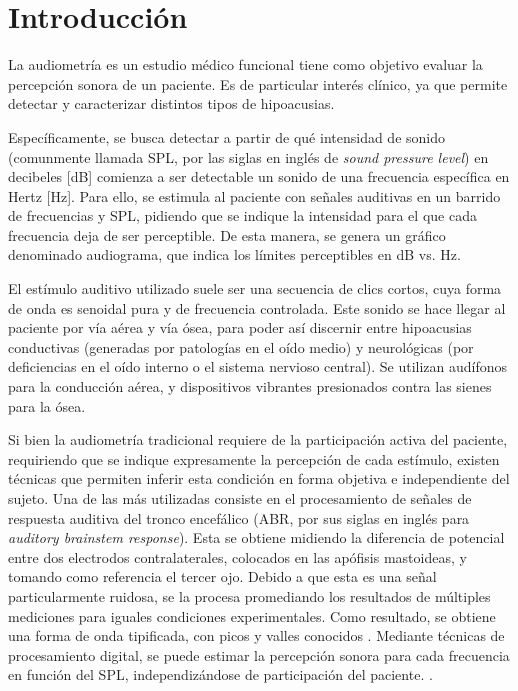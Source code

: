 \section{Introducción} \label{introduccion}

La audiometría es un estudio médico funcional tiene como objetivo evaluar la percepción sonora de un paciente.
Es de particular interés clínico, ya que permite detectar y caracterizar distintos tipos de hipoacusias.

Específicamente, se busca detectar a partir de qué intensidad de sonido (comunmente llamada SPL, por las siglas en inglés de \textit{sound pressure level}) en decibeles [dB] comienza a ser detectable un sonido de una frecuencia específica en Hertz [Hz].
Para ello, se estimula al paciente con señales auditivas en un barrido de frecuencias y SPL, pidiendo que se indique la intensidad para el que cada frecuencia deja de ser perceptible.
De esta manera, se genera un gráfico denominado audiograma, que indica los límites perceptibles en dB vs. Hz.

El estímulo auditivo utilizado suele ser una secuencia de clics cortos, cuya forma de onda es senoidal pura y de frecuencia controlada.
Este sonido se hace llegar al paciente por vía aérea y vía ósea, para poder así discernir entre hipoacusias conductivas (generadas por patologías en el oído medio) y neurológicas (por deficiencias en el oído interno o el sistema nervioso central).
Se utilizan audífonos para la conducción aérea, y dispositivos vibrantes presionados contra las sienes para la ósea.

Si bien la audiometría tradicional requiere de la participación activa del paciente, requiriendo que se indique expresamente la percepción de cada estímulo, existen técnicas que permiten inferir esta condición en forma objetiva e independiente del sujeto.
Una de las más utilizadas consiste en el procesamiento de señales de respuesta auditiva del tronco encefálico (ABR, por sus siglas en inglés para \textit{auditory brainstem response}).
Esta se obtiene midiendo la diferencia de potencial entre dos electrodos contralaterales, colocados en las apófisis mastoideas, y tomando como referencia el tercer ojo.
Debido a que esta es una señal particularmente ruidosa, se la procesa promediando los resultados de múltiples mediciones para iguales condiciones experimentales.
Como resultado, se obtiene una forma de onda tipificada, con picos y valles conocidos \cite{shojaeemend_automated_2018}.
Mediante técnicas de procesamiento digital, se puede estimar la percepción sonora para cada frecuencia en función del SPL, independizándose de participación del paciente. \cite{silva_objective_2009}.

